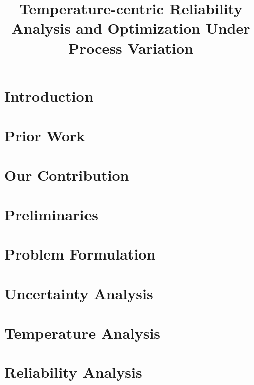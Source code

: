 \documentclass[conference]{IEEEtran}
\title{Temperature-centric Reliability Analysis and Optimization Under Process Variation}
\author{}
\begin{document}
  \maketitle

  \begin{abstract}
    
  \end{abstract}


  \section{Introduction} 
  

  \section{Prior Work} 
  

  \section{Our Contribution} 
  

  \section{Preliminaries} 
  

  \section{Problem Formulation} 
  

  \section{Uncertainty Analysis} 
  

  \section{Temperature Analysis} 
  

  \section{Reliability Analysis} 
  
\end{document}
